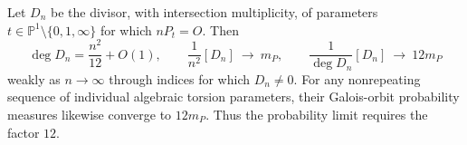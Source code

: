 \begin{proposition}\hypertarget{tag-001K}{}\label{ari:C.8.10}

Let $D_n$ be the divisor, with intersection multiplicity, of
parameters $t\in\mathbb P^1\setminus\{0,1,\infty\}$ for which
$nP_t=O$. Then
\[
 \deg D_n=\frac{n^2}{12}+O(1),\qquad
 \frac1{n^2}[D_n]\ \longrightarrow\ m_P,\qquad
 \frac1{\deg D_n}[D_n]\ \longrightarrow\ 12m_P
\]
weakly as $n\to\infty$ through indices for which $D_n\ne0$.
For any nonrepeating sequence of individual algebraic torsion
parameters, their Galois-orbit probability measures likewise
converge to $12m_P$. Thus the probability limit requires the factor $12$.
\end{proposition}


